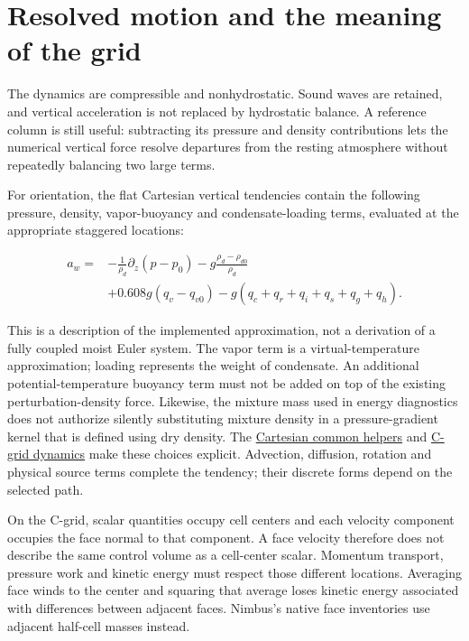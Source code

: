 \documentclass[
  11pt,
]{report}
\begin{document}
\section{Resolved motion and the meaning of the
grid}\label{resolved-motion-and-the-meaning-of-the-grid}

The dynamics are compressible and nonhydrostatic. Sound waves are
retained, and vertical acceleration is not replaced by hydrostatic
balance. A reference column is still useful: subtracting its pressure
and density contributions lets the numerical vertical force resolve
departures from the resting atmosphere without repeatedly balancing two
large terms.

For orientation, the flat Cartesian vertical tendencies contain the
following pressure, density, vapor-buoyancy and condensate-loading
terms, evaluated at the appropriate staggered locations:

\[\begin{aligned}
a_w={}&-\frac{1}{\rho_d}\partial_z(p-p_0)
-g\frac{\rho_d-\rho_{d0}}{\rho_d} \\
&+0.608g(q_v-q_{v0})-g(q_c+q_r+q_i+q_s+q_g+q_h).
\end{aligned}\]

This is a description of the implemented approximation, not a derivation
of a fully coupled moist Euler system. The vapor term is a
virtual-temperature approximation; loading represents the weight of
condensate. An additional potential-temperature buoyancy term must not
be added on top of the existing perturbation-density force. Likewise,
the mixture mass used in energy diagnostics does not authorize silently
substituting mixture density in a pressure-gradient kernel that is
defined using dry density. The
\href{../src/dynamics/schemes/klemp_wilhelmson_split/cartesian_common.hpp}{Cartesian
common helpers} and
\href{../src/dynamics/schemes/klemp_wilhelmson_split/cartesian_cgrid_3d.cpp}{C-grid
dynamics} make these choices explicit. Advection, diffusion, rotation
and physical source terms complete the tendency; their discrete forms
depend on the selected path.

On the C-grid, scalar quantities occupy cell centers and each velocity
component occupies the face normal to that component. A face velocity
therefore does not describe the same control volume as a cell-center
scalar. Momentum transport, pressure work and kinetic energy must
respect those different locations. Averaging face winds to the center
and squaring that average loses kinetic energy associated with
differences between adjacent faces. Nimbus's native face inventories use
adjacent half-cell masses instead.
\end{document}
